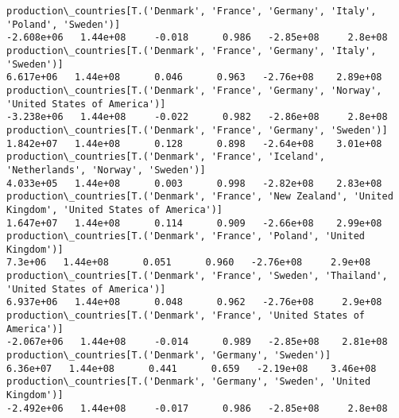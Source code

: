 \documentclass[11pt]{article}
\begin{document}
\begin{Verbatim}[commandchars=\\\{\}]
production\_countries[T.('Denmark', 'France', 'Germany', 'Italy', 'Poland', 'Sweden')]                                                                                                 -2.608e+06   1.44e+08     -0.018      0.986   -2.85e+08     2.8e+08
production\_countries[T.('Denmark', 'France', 'Germany', 'Italy', 'Sweden')]                                                                                                            6.617e+06   1.44e+08      0.046      0.963   -2.76e+08    2.89e+08
production\_countries[T.('Denmark', 'France', 'Germany', 'Norway', 'United States of America')]                                                                                        -3.238e+06   1.44e+08     -0.022      0.982   -2.86e+08     2.8e+08
production\_countries[T.('Denmark', 'France', 'Germany', 'Sweden')]                                                                                                                     1.842e+07   1.44e+08      0.128      0.898   -2.64e+08    3.01e+08
production\_countries[T.('Denmark', 'France', 'Iceland', 'Netherlands', 'Norway', 'Sweden')]                                                                                            4.033e+05   1.44e+08      0.003      0.998   -2.82e+08    2.83e+08
production\_countries[T.('Denmark', 'France', 'New Zealand', 'United Kingdom', 'United States of America')]                                                                             1.647e+07   1.44e+08      0.114      0.909   -2.66e+08    2.99e+08
production\_countries[T.('Denmark', 'France', 'Poland', 'United Kingdom')]                                                                                                                7.3e+06   1.44e+08      0.051      0.960   -2.76e+08     2.9e+08
production\_countries[T.('Denmark', 'France', 'Sweden', 'Thailand', 'United States of America')]                                                                                        6.937e+06   1.44e+08      0.048      0.962   -2.76e+08     2.9e+08
production\_countries[T.('Denmark', 'France', 'United States of America')]                                                                                                             -2.067e+06   1.44e+08     -0.014      0.989   -2.85e+08    2.81e+08
production\_countries[T.('Denmark', 'Germany', 'Sweden')]                                                                                                                                6.36e+07   1.44e+08      0.441      0.659   -2.19e+08    3.46e+08
production\_countries[T.('Denmark', 'Germany', 'Sweden', 'United Kingdom')]                                                                                                            -2.492e+06   1.44e+08     -0.017      0.986   -2.85e+08     2.8e+08

\end{Verbatim}
\end{document}
